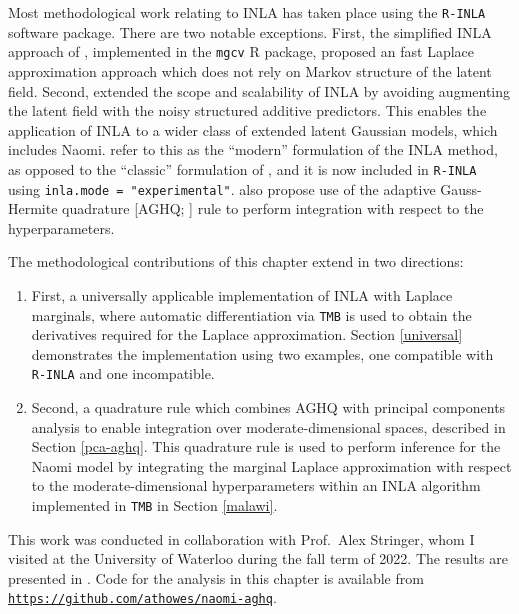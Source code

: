 \documentclass[a4paper, nobind]{templates/ociamthesis}
\providecommand{\tightlist}{%
  \setlength{\itemsep}{0pt}\setlength{\parskip}{0pt}}
\begin{document}
Most methodological work relating to INLA has taken place using the \texttt{R-INLA} software package.
There are two notable exceptions.
First, the simplified INLA approach of \textcite{wood2020simplified}, implemented in the \texttt{mgcv} R package, proposed an fast Laplace approximation approach which does not rely on Markov structure of the latent field.
Second, \textcite{stringer2022fast} extended the scope and scalability of INLA by avoiding augmenting the latent field with the noisy structured additive predictors.
This enables the application of INLA to a wider class of extended latent Gaussian models, which includes Naomi.
\textcite{van2023new} refer to this as the ``modern'' formulation of the INLA method, as opposed to the ``classic'' formulation of \textcite{rue2009approximate}, and it is now included in \texttt{R-INLA} using \texttt{inla.mode\ =\ "experimental"}.
\textcite{stringer2022fast} also propose use of the adaptive Gauss-Hermite quadrature {[}AGHQ; \textcite{naylor1982applications}{]} rule to perform integration with respect to the hyperparameters.

The methodological contributions of this chapter extend \textcite{stringer2022fast} in two directions:

\begin{enumerate}
\def\labelenumi{\arabic{enumi}.}
\tightlist
\item
  First, a universally applicable implementation of INLA with Laplace marginals, where automatic differentiation via \texttt{TMB} is used to obtain the derivatives required for the Laplace approximation.
  Section \ref{universal} demonstrates the implementation using two examples, one compatible with \texttt{R-INLA} and one incompatible.
\item
  Second, a quadrature rule which combines AGHQ with principal components analysis to enable integration over moderate-dimensional spaces, described in Section \ref{pca-aghq}.
  This quadrature rule is used to perform inference for the Naomi model by integrating the marginal Laplace approximation with respect to the moderate-dimensional hyperparameters within an INLA algorithm implemented in \texttt{TMB} in Section \ref{malawi}.
\end{enumerate}

This work was conducted in collaboration with Prof.~Alex Stringer, whom I visited at the University of Waterloo during the fall term of 2022.
The results are presented in \textcite{howes2023fast}.
Code for the analysis in this chapter is available from \href{https://github.com/athowes/naomi-aghq}{\texttt{https://github.com/athowes/naomi-aghq}}.
\end{document}

